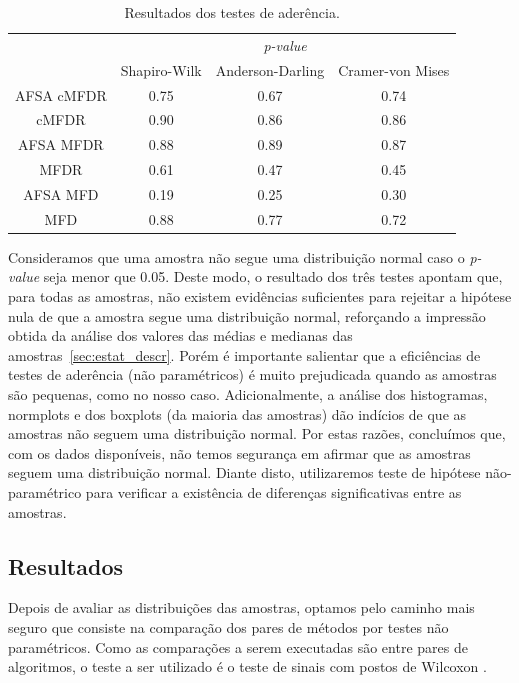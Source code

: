 \documentclass[conference]{IEEEtran}
\begin{document}
\begin{table}[h]
	\centering
	\caption{Resultados dos testes de aderência.}
	\label{tab:aderencia}
	\begin{tabular}{c|ccc}
		\hline
		& \multicolumn{3}{c}{\textit{p-value}}      \\
		\cline{2-4}
						& Shapiro-Wilk 	& Anderson-Darling  & Cramer-von Mises\\
		\hline
		AFSA cMFDR		& 0.75       	& 0.67           	& 0.74 \\
		cMFDR 			& 0.90       	& 0.86          	& 0.86 \\
		AFSA MFDR  		& 0.88       	& 0.89          	& 0.87 \\
		MFDR  			& 0.61       	& 0.47            	& 0.45 \\
		AFSA MFD   		& 0.19       	& 0.25          	& 0.30 \\
		MFD   			& 0.88       	& 0.77          	& 0.72 \\
		\hline
	\end{tabular}
\end{table}

Consideramos que uma amostra não segue uma distribuição normal caso o \textit{p-value} seja menor que 0.05.
Deste modo, o resultado dos três testes apontam que, para todas as amostras, não existem evidências suficientes para rejeitar a hipótese nula de que a amostra segue uma distribuição normal, reforçando a impressão obtida da análise dos valores das médias e medianas das amostras~\ref{sec:estat_descr}.
Porém é importante salientar que a eficiências de testes de aderência (não paramétricos) é muito prejudicada quando as amostras são pequenas, como no nosso caso.
Adicionalmente, a análise dos histogramas, normplots e dos boxplots (da maioria das amostras) dão indícios de que as amostras não seguem uma distribuição normal.
Por estas razões, concluímos que, com os dados disponíveis, não temos segurança em afirmar que as amostras seguem uma distribuição normal.
Diante disto, utilizaremos teste de hipótese não-paramétrico para verificar a existência de diferenças significativas entre as amostras.

\subsection{Resultados}

Depois de avaliar as distribuições das amostras, optamos pelo caminho mais seguro que consiste na comparação dos pares de métodos por testes não paramétricos. 
Como as comparações a serem executadas são entre pares de algoritmos, o teste a ser utilizado é o teste de sinais com postos de Wilcoxon \cite{wilcoxon1945individual}.
\end{document}
